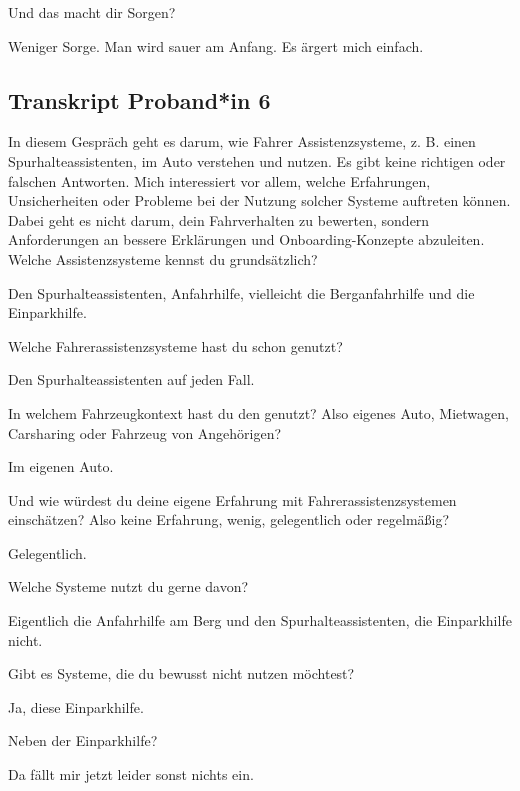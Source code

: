 \interviewerin
Und das macht dir Sorgen?

Weniger Sorge. Man wird sauer am Anfang. Es ärgert mich einfach.



\clearpage
\subsection{Transkript Proband*in 6}
\label{subsec:transkript-p6}

\interviewerin
In diesem Gespräch geht es darum, wie Fahrer Assistenzsysteme, z. B.
einen Spurhalteassistenten, im Auto verstehen und nutzen. Es gibt keine
richtigen oder falschen Antworten. Mich interessiert vor allem, welche
Erfahrungen, Unsicherheiten oder Probleme bei der Nutzung solcher
Systeme auftreten können. Dabei geht es nicht darum, dein Fahrverhalten
zu bewerten, sondern Anforderungen an bessere Erklärungen und
Onboarding-Konzepte abzuleiten. Welche Assistenzsysteme kennst du
grundsätzlich?

Den Spurhalteassistenten, Anfahrhilfe, vielleicht die Berganfahrhilfe
und die Einparkhilfe.

\interviewerin
Welche Fahrerassistenzsysteme hast du schon genutzt?

Den Spurhalteassistenten auf jeden Fall.

\interviewerin
In welchem Fahrzeugkontext hast du den genutzt? Also eigenes Auto,
Mietwagen, Carsharing oder Fahrzeug von Angehörigen?

Im eigenen Auto.

\interviewerin
Und wie würdest du deine eigene Erfahrung mit Fahrerassistenzsystemen
einschätzen? Also keine Erfahrung, wenig, gelegentlich oder regelmäßig?

Gelegentlich.

\interviewerin
Welche Systeme nutzt du gerne davon?

Eigentlich die Anfahrhilfe am Berg und den Spurhalteassistenten, die
Einparkhilfe nicht.

\interviewerin
Gibt es Systeme, die du bewusst nicht nutzen möchtest?

Ja, diese Einparkhilfe.

\interviewerin
Neben der Einparkhilfe?

Da fällt mir jetzt leider sonst nichts ein.


